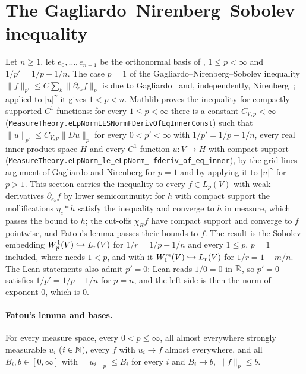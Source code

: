 \section{The Gagliardo--Nirenberg--Sobolev inequality}
\label{sec:gagliardo-nirenberg-sobolev}

Let $n \geq 1$, let $e_0, \dots, e_{n-1}$ be the orthonormal basis of ,
$1 \leq p < \infty$ and $1/p' = 1/p - 1/n$. The case $p = 1$ of the Gagliardo--Nirenberg--Sobolev
inequality $\|f\|_{p'} \leq C \sum_k \|\partial_{e_k} f\|_p$ is due to
Gagliardo~\cite{Gagliardo1958} and, independently, Nirenberg~\cite{Nirenberg1959}; applied to
$|u|^\gamma$ it gives $1 < p < n$. Mathlib proves the inequality for compactly supported $C^1$
functions: for every $1 \leq p < \infty$ there is a constant $C_{V,p} < \infty$
(\texttt{MeasureTheory.\allowbreak eLpNormLESNormFDerivOfEqInnerConst}) such that
$\|u\|_{p'} \leq C_{V,p} \|Du\|_p$ for every $0 < p' < \infty$ with $1/p' = 1/p - 1/n$, every
real inner product space $H$ and every $C^1$ function $u \colon V \to H$ with compact support
(\texttt{MeasureTheory.\allowbreak eLpNorm\_\allowbreak le\_\allowbreak eLpNorm\_\allowbreak
fderiv\_\allowbreak of\_\allowbreak eq\_\allowbreak inner}), by the grid-lines argument of
Gagliardo and Nirenberg for $p = 1$ and by applying it to $|u|^\gamma$ for $p > 1$. This section
carries the inequality to every $f \in L_p(V)$ with weak derivatives $\partial_{e_k} f$ by lower
semicontinuity: for $h$ with compact support the mollifications $\eta_c * h$ satisfy the
inequality and converge to $h$ in measure, which passes the bound to $h$; the cut-offs
$\chi_R f$ have compact support and converge to $f$ pointwise, and Fatou's lemma passes their
bounds to $f$. The result is the Sobolev embedding $W^{1}_{p}(V) \hookrightarrow L_r(V)$ for
$1/r = 1/p - 1/n$ and every $1 \leq p$, $p = 1$ included, where
 needs $1 < p$, and with it
$W^{m}_{1}(V) \hookrightarrow L_r(V)$ for $1/r = 1 - m/n$. The Lean statements also admit
$p' = 0$: Lean reads $1/0 = 0$ in $\mathbb{R}$, so $p' = 0$ satisfies $1/p' = 1/p - 1/n$ for $p = n$,
and the left side is then the norm of exponent $0$, which is $0$.

\paragraph{Fatou's lemma and bases.}

\begin{lemma}
\label{lem:fatou-bounded-norms}
\leanok
For every measure space, every $0 < p \leq \infty$, all almost everywhere strongly measurable
$u_i$ ($i \in \mathbb{N}$), every $f$ with $u_i \to f$ almost everywhere, and all
$B_i, b \in [0, \infty]$ with $\|u_i\|_p \leq B_i$ for every $i$ and $B_i \to b$,
$\|f\|_p \leq b$.
\end{lemma}

